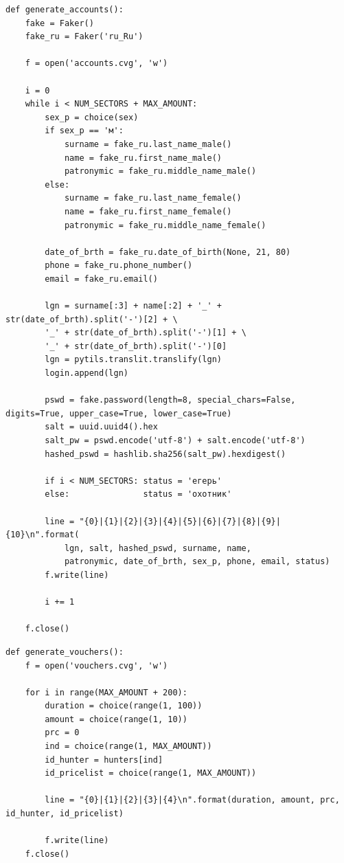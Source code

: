 		\begin{lstlisting}[caption = {Генерация данных для таблицы accounts}, label=lst:create_faker1]
def generate_accounts():
	fake = Faker()
	fake_ru = Faker('ru_Ru')
	
	f = open('accounts.cvg', 'w')
	
	i = 0
	while i < NUM_SECTORS + MAX_AMOUNT:
		sex_p = choice(sex)
		if sex_p == 'м':
			surname = fake_ru.last_name_male()
			name = fake_ru.first_name_male()
			patronymic = fake_ru.middle_name_male()
		else:
			surname = fake_ru.last_name_female()
			name = fake_ru.first_name_female()
			patronymic = fake_ru.middle_name_female()
		
		date_of_brth = fake_ru.date_of_birth(None, 21, 80)
		phone = fake_ru.phone_number()
		email = fake_ru.email()
		
		lgn = surname[:3] + name[:2] + '_' + str(date_of_brth).split('-')[2] + \
		'_' + str(date_of_brth).split('-')[1] + \
		'_' + str(date_of_brth).split('-')[0]
		lgn = pytils.translit.translify(lgn)
		login.append(lgn)
		
		pswd = fake.password(length=8, special_chars=False, digits=True, upper_case=True, lower_case=True)
		salt = uuid.uuid4().hex
		salt_pw = pswd.encode('utf-8') + salt.encode('utf-8')
		hashed_pswd = hashlib.sha256(salt_pw).hexdigest()
		
		if i < NUM_SECTORS:	status = 'егерь'
		else:				status = 'охотник'
		
		line = "{0}|{1}|{2}|{3}|{4}|{5}|{6}|{7}|{8}|{9}|{10}\n".format(
			lgn, salt, hashed_pswd, surname, name,
			patronymic, date_of_brth, sex_p, phone, email, status)
		f.write(line)
		
		i += 1
	
	f.close()
		\end{lstlisting}
	
	\begin{lstlisting}[caption = {Генерация данных для таблицы vouchers}, label=lst:create_faker2]
def generate_vouchers():
	f = open('vouchers.cvg', 'w')
	
	for i in range(MAX_AMOUNT + 200):
		duration = choice(range(1, 100))
		amount = choice(range(1, 10))
		prc = 0
		ind = choice(range(1, MAX_AMOUNT))
		id_hunter = hunters[ind]
		id_pricelist = choice(range(1, MAX_AMOUNT))
		
		line = "{0}|{1}|{2}|{3}|{4}\n".format(duration, amount, prc, id_hunter, id_pricelist)
		
		f.write(line)
	f.close()
	\end{lstlisting}
		

